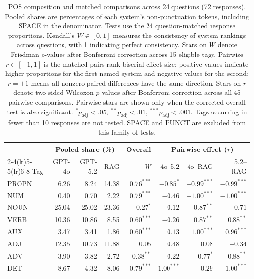\begin{table}[tbp]
\centering
\caption{POS composition and matched comparisons across 24 questions (72 responses). Pooled shares are percentages of each system's non-punctuation tokens, including SPACE in the denominator. Tests use the 24 question-matched response proportions. Kendall's $W\in[0,1]$ measures the consistency of system rankings across questions, with 1 indicating perfect consistency. Stars on $W$ denote Friedman $p$-values after Bonferroni correction across 15 eligible tags. Pairwise $r\in[-1,1]$ is the matched-pairs rank-biserial effect size: positive values indicate higher proportions for the first-named system and negative values for the second; $r=\pm1$ means all nonzero paired differences have the same direction. Stars on $r$ denote two-sided Wilcoxon $p$-values after Bonferroni correction across all 45 pairwise comparisons. Pairwise stars are shown only when the corrected overall test is also significant. $^{*}p_{\mathrm{adj}}<.05$, $^{**}p_{\mathrm{adj}}<.01$, $^{***}p_{\mathrm{adj}}<.001$. Tags occurring in fewer than 10 responses are not tested. SPACE and PUNCT are excluded from this family of tests.}
\label{tab:pos}
\small
\setlength{\tabcolsep}{4pt}
\begin{tabular}{lrrrrrrr}
\toprule
 & \multicolumn{3}{c}{Pooled share (\%)} & Overall & \multicolumn{3}{c}{Pairwise effect ($r$)} \\
\cmidrule(lr){2-4}\cmidrule(lr){5-5}\cmidrule(lr){6-8}
Tag & GPT-4o & GPT-5.2 & RAG & $W$ & 4o--5.2 & 4o--RAG & 5.2--RAG \\
\midrule
PROPN & 6.26 & 8.24 & 14.38 & $0.76^{***}$ & $-0.85^{*}$ & $-0.99^{***}$ & $-0.99^{***}$ \\
NUM & 0.40 & 0.70 & 2.22 & $0.79^{***}$ & $-0.46$ & $-1.00^{***}$ & $-1.00^{***}$ \\
NOUN & 25.04 & 25.02 & 23.36 & $0.27^{*}$ & $0.12$ & $0.87^{**}$ & $0.71$ \\
VERB & 10.36 & 10.86 & 8.55 & $0.60^{***}$ & $-0.26$ & $0.87^{**}$ & $0.88^{**}$ \\
AUX & 3.47 & 3.41 & 1.86 & $0.60^{***}$ & $0.13$ & $1.00^{***}$ & $0.96^{***}$ \\
ADJ & 12.35 & 10.73 & 11.88 & $0.05$ & $0.48$ & $0.08$ & $-0.34$ \\
ADV & 3.90 & 3.82 & 2.72 & $0.38^{**}$ & $0.22$ & $0.77^{*}$ & $0.88^{**}$ \\
DET & 8.67 & 4.32 & 8.06 & $0.79^{***}$ & $1.00^{***}$ & $0.29$ & $-1.00^{***}$ \\

\end{tabular}
\end{table}
